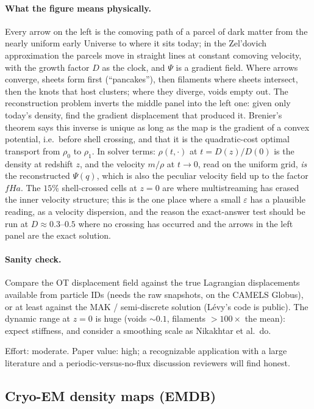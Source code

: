 \documentclass[11pt]{article}
\newcommand{\eps}{\varepsilon}
\begin{document}
\paragraph{What the figure means physically.} Every arrow on the left is the
comoving path of a parcel of dark matter from the nearly uniform early Universe to
where it sits today; in the Zel'dovich approximation the parcels move in straight
lines at constant comoving velocity, with the growth factor $D$ as the clock, and
$\Psi$ is a gradient field. Where arrows converge, sheets form first (``pancakes''),
then filaments where sheets intersect, then the knots that host clusters; where
they diverge, voids empty out. The reconstruction problem inverts the middle panel
into the left one: given only today's density, find the gradient displacement that
produced it. Brenier's theorem says this inverse is unique as long as the map is
the gradient of a convex potential, i.e.\ before shell crossing, and that it is the
quadratic-cost optimal transport from $\rho_0$ to $\rho_1$. In solver terms:
$\rho(t,\cdot)$ at $t=D(z)/D(0)$ is the density at redshift $z$, and the velocity
$m/\rho$ at $t\to0$, read on the uniform grid, \emph{is} the reconstructed
$\Psi(q)$, which is also the peculiar velocity field up to the factor $fHa$. The
$15\%$ shell-crossed cells at $z=0$ are where multistreaming has erased the inner
velocity structure; this is the one place where a small $\eps$ has a plausible
reading, as a velocity dispersion, and the reason the exact-answer test should be
run at $D\approx0.3$--$0.5$ where no crossing has occurred and the arrows in the left
panel are the exact solution.

\paragraph{Sanity check.} Compare the OT displacement field against the true
Lagrangian displacements available from particle IDs (needs the raw snapshots, on the
CAMELS Globus), or at least against the MAK / semi-discrete solution (L\'evy's code is
public). The dynamic range at $z=0$ is huge (voids $\sim0.1$, filaments $>100\times$
the mean): expect stiffness, and consider a smoothing scale as Nikakhtar et al.\ do.

Effort: moderate. Paper value: high; a recognizable application with a large
literature and a periodic-versus-no-flux discussion reviewers will find honest.

\subsection{Cryo-EM density maps (EMDB)}
\label{sec:cryoem}
\end{document}
